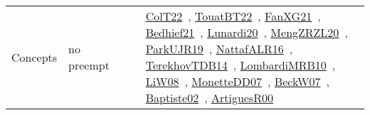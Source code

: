 {\begin{longtable}{lp{3cm}>{\raggedright\arraybackslash}p{6cm}>{\raggedright\arraybackslash}p{6cm}>{\raggedright\arraybackslash}p{8cm}}
Concepts & no preempt &  &  & \href{../works/ColT22.pdf}{ColT22}~\cite{ColT22}, \href{../works/TouatBT22.pdf}{TouatBT22}~\cite{TouatBT22}, \href{../works/FanXG21.pdf}{FanXG21}~\cite{FanXG21}, \href{../works/Bedhief21.pdf}{Bedhief21}~\cite{Bedhief21}, \href{../works/Lunardi20.pdf}{Lunardi20}~\cite{Lunardi20}, \href{../works/MengZRZL20.pdf}{MengZRZL20}~\cite{MengZRZL20}, \href{../works/ParkUJR19.pdf}{ParkUJR19}~\cite{ParkUJR19}, \href{../works/NattafALR16.pdf}{NattafALR16}~\cite{NattafALR16}, \href{../works/TerekhovTDB14.pdf}{TerekhovTDB14}~\cite{TerekhovTDB14}, \href{../works/LombardiMRB10.pdf}{LombardiMRB10}~\cite{LombardiMRB10}, \href{../works/LiW08.pdf}{LiW08}~\cite{LiW08}, \href{../works/MonetteDD07.pdf}{MonetteDD07}~\cite{MonetteDD07}, \href{../works/BeckW07.pdf}{BeckW07}~\cite{BeckW07}, \href{../works/Baptiste02.pdf}{Baptiste02}~\cite{Baptiste02}, \href{../works/ArtiguesR00.pdf}{ArtiguesR00}~\cite{ArtiguesR00}\\

\end{longtable}}
